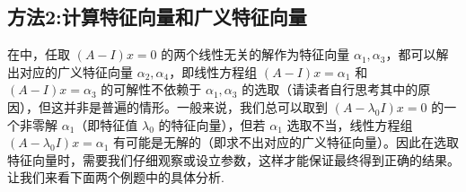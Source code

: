 \documentclass[../../main.tex]{subfiles}
\begin{document}
\subsection{方法2:计算特征向量和广义特征向量}

在中，任取 $(A - I)x = 0$ 的两个线性无关的解作为特征向量 $\alpha_1,\alpha_3$，都可以解出对应的广义特征向量 $\alpha_2,\alpha_4$，即线性方程组 $(A - I)x = \alpha_1$ 和 $(A - I)x = \alpha_3$ 的可解性不依赖于 $\alpha_1,\alpha_3$ 的选取（请读者自行思考其中的原因），但这并非是普遍的情形。一般来说，我们总可以取到 $(A - \lambda_0I)x = 0$ 的一个非零解 $\alpha_1$（即特征值 $\lambda_0$ 的特征向量），但若 $\alpha_1$ 选取不当，线性方程组 $(A - \lambda_0I)x = \alpha_1$ 有可能是无解的（即求不出对应的广义特征向量）。因此在选取特征向量时，需要我们仔细观察或设立参数，这样才能保证最终得到正确的结果。让我们来看下面两个例题中的具体分析.
\end{document}
